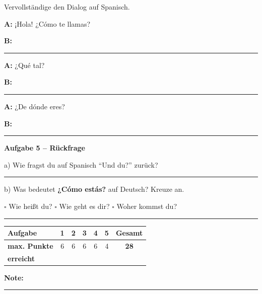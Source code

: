 \documentclass[11pt, a4paper]{article}
\newcommand{\punktebox}[1]{\hfill\fbox{\small \_\_\_/#1}}
\newcommand{\luecke}[1]{\rule{#1}{0.4pt}}
\newcommand{\es}[1]{\textcolor{spanisch}{\textbf{#1}}}
\begin{document}
\noindent Vervollständige den Dialog auf Spanisch.

\vspace{10pt}

\noindent
\textbf{A:} ¡Hola! ¿Cómo te llamas?

\vspace{0.5em}
\noindent
\textbf{B:} \luecke{8cm}

\vspace{0.8em}
\noindent
\textbf{A:} ¿Qué tal?

\vspace{0.5em}
\noindent
\textbf{B:} \luecke{8cm}

\vspace{0.8em}
\noindent
\textbf{A:} ¿De dónde eres?

\vspace{0.5em}
\noindent
\textbf{B:} \luecke{8cm}

\vspace{15pt}


\noindent\textbf{\textcolor{spanisch}{Aufgabe 5 -- Rückfrage}} \punktebox{4}

\noindent
a) Wie fragst du auf Spanisch ``Und du?'' zurück?

\vspace{0.5em}
\noindent \luecke{5cm}

\vspace{0.8em}
\noindent
b) Was bedeutet \es{¿Cómo estás?} auf Deutsch? Kreuze an.

\vspace{5pt}

\noindent
$\square$ Wie heißt du? \hspace{2cm} $\square$ Wie geht es dir? \hspace{2cm} $\square$ Woher kommst du?


\vspace{20pt}
\hrule
\vspace{10pt}

\noindent
\begin{tabularx}{\textwidth}{|X|c|c|c|c|c||c|}
\hline
\textbf{Aufgabe} & 1 & 2 & 3 & 4 & 5 & \textbf{Gesamt} \\
\hline
\textbf{max. Punkte} & 6 & 6 & 6 & 6 & 4 & \textbf{28} \\
\hline
\textbf{erreicht} & & & & & & \\[0.6em]
\hline
\end{tabularx}

\vspace{10pt}

\begin{flushright}
\textbf{Note:} \luecke{2cm}
\end{flushright}
\end{document}
